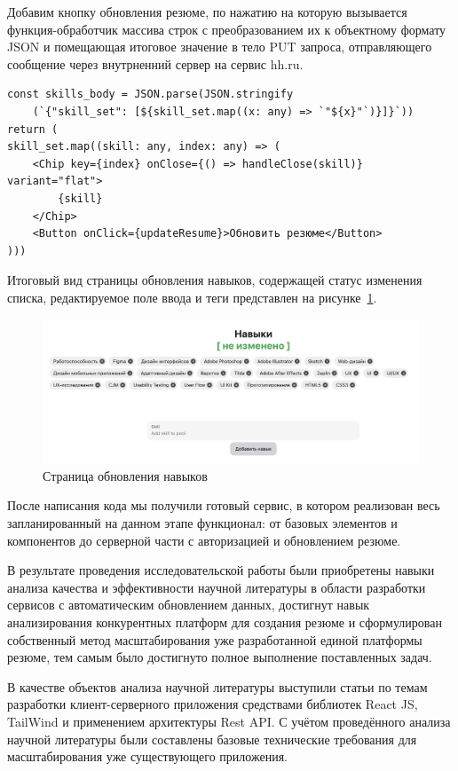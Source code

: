 \documentclass[master, och, pract]{SCWorks}
\begin{document}
Добавим кнопку обновления резюме, по нажатию на которую вызывается функция-обработчик массива строк с преобразованием их к объектному формату JSON и помещающая итоговое значение в тело PUT запроса, отправляющего сообщение через внутрненний сервер на сервис hh.ru.
\begin{verbatim}
const skills_body = JSON.parse(JSON.stringify
    (`{"skill_set": [${skill_set.map((x: any) => `"${x}"`)}]}`))
return (
skill_set.map((skill: any, index: any) => (
    <Chip key={index} onClose={() => handleClose(skill)} variant="flat">
        {skill}
    </Chip>
    <Button onClick={updateResume}>Обновить резюме</Button>
)))
\end{verbatim}

Итоговый вид страницы обновления навыков, содержащей статус изменения списка, редактируемое поле ввода и теги представлен на рисунке~\ref{fig:6}. 
\begin{figure}[!ht]
    \centering
    \includegraphics[width=12cm]{images/image-update-skills.png}
    \caption{\label{fig:6}%
        Страница обновления навыков}
\end{figure}

После написания кода мы получили готовый сервис, в котором реализован весь запланированный на данном этапе функционал: от базовых элементов и компонентов до серверной части с авторизацией и обновлением резюме.




\newpage
\conclusion
В результате проведения исследовательской работы были приобретены навыки анализа качества и эффективности научной литературы в области разработки сервисов с автоматическим обновлением данных, достигнут навык анализирования конкурентных платформ для создания резюме и сформулирован собственный метод масштабирования уже разработанной единой платформы резюме, тем самым было достигнуто полное выполнение поставленных задач. 

В качестве объектов анализа научной литературы выступили статьи по темам разработки клиент-серверного приложения средствами библиотек React JS, TailWind и применением архитектуры Rest API. С учётом проведённого анализа научной литературы были составлены базовые технические требования для масштабирования уже существующего приложения.
\end{document}
